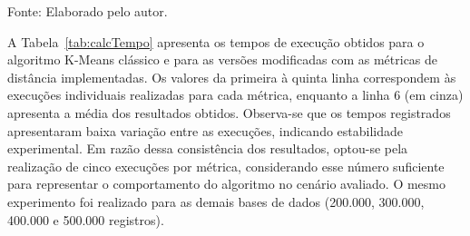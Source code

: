 \documentclass[10pt,a4paper,twocolumn]{article}
\begin{document}
\begin{strip}
\centering

\begin{table}[H]
\centering
\caption{Tempo de execução das métricas de distância}
\label{tab:calcTempo}


\smallskip
\footnotesize
Fonte: Elaborado pelo autor.

\end{table}

\end{strip}

A Tabela~\ref{tab:calcTempo} apresenta os tempos de execução obtidos para o algoritmo K-Means clássico e para as versões modificadas com as métricas de distância implementadas. Os valores da primeira à quinta linha correspondem às execuções individuais realizadas para cada métrica, enquanto a linha 6 (em cinza) apresenta a média dos resultados obtidos. Observa-se que os tempos registrados apresentaram baixa variação entre as execuções, indicando estabilidade experimental. Em razão dessa consistência dos resultados, optou-se pela realização de cinco execuções por métrica, considerando esse número suficiente para representar o comportamento do algoritmo no cenário avaliado. O mesmo experimento foi realizado para as demais bases de dados (200.000, 300.000, 400.000 e 500.000 registros). 
\end{document}

